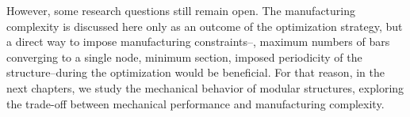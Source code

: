 However, some research questions still remain open. The manufacturing complexity is discussed here only as an outcome of the optimization strategy, but a direct way to impose manufacturing constraints--\eg, maximum numbers of bars converging to a single node, minimum section, imposed periodicity of the structure--during the optimization would be beneficial. For that reason, in the next chapters, we study the mechanical behavior of modular structures, exploring the trade-off between mechanical performance and manufacturing complexity.